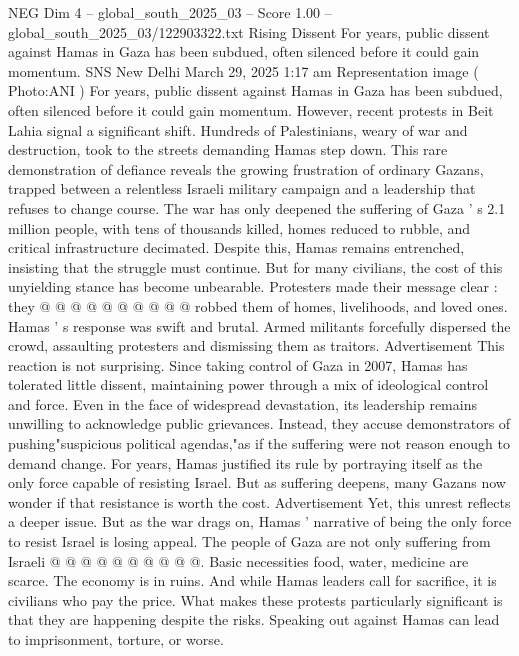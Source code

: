\begin{textsample}{NEG Dim 4 – global\_south\_2025\_03 – Score 1.00 – global\_south\_2025\_03/122903322.txt}  \label{ex:f4_neg_426}
Rising Dissent For years, public dissent against Hamas in Gaza has been subdued, often silenced before it could gain momentum.
SNS New Delhi March 29, 2025 1:17 am Representation image ( Photo:ANI ) For years, public dissent against Hamas in Gaza has been subdued, often silenced before it could gain momentum.
However, recent protests in Beit Lahia signal a significant shift.
Hundreds of Palestinians, weary of war and destruction, took to the streets demanding Hamas step down.
This rare demonstration of defiance reveals the growing frustration of ordinary Gazans, trapped between a relentless Israeli military campaign and a leadership that refuses to change course.
The war has only deepened the suffering of Gaza ' s 2.1 million people, with tens of thousands killed, homes reduced to rubble, and critical infrastructure decimated.
Despite this, Hamas remains entrenched, insisting that the struggle must continue.
But for many civilians, the cost of this unyielding stance has become unbearable.
Protesters made their message clear : they @ @ @ @ @ @ @ @ @ @ robbed them of homes, livelihoods, and loved ones.
Hamas ' s response was swift and brutal.
Armed militants forcefully dispersed the crowd, assaulting protesters and dismissing them as traitors.
Advertisement This reaction is not surprising.
Since taking control of Gaza in 2007, Hamas has tolerated little dissent, maintaining power through a mix of ideological control and force.
Even in the face of widespread devastation, its leadership remains unwilling to acknowledge public grievances.
Instead, they accuse demonstrators of pushing"suspicious political agendas,"as if the suffering were not reason enough to demand change.
For years, Hamas justified its rule by portraying itself as the only force capable of resisting Israel.
But as suffering deepens, many Gazans now wonder if that resistance is worth the cost.
Advertisement Yet, this unrest reflects a deeper issue.
But as the war drags on, Hamas ' narrative of being the only force to resist Israel is losing appeal.
The people of Gaza are not only suffering from Israeli @ @ @ @ @ @ @ @ @ @.
Basic necessities food, water, medicine are scarce.
The economy is in ruins.
And while Hamas leaders call for sacrifice, it is civilians who pay the price.
What makes these protests particularly significant is that they are happening despite the risks.
Speaking out against Hamas can lead to imprisonment, torture, or worse.

\end{textsample}
